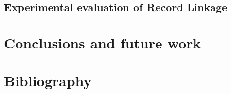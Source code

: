 \documentclass[paper=a4, fontsize=11pt]{scrartcl}
\begin{document}
\subsection{Experimental evaluation of Record Linkage}




\section{Conclusions and future work}




\section{Bibliography}





\end{document}
